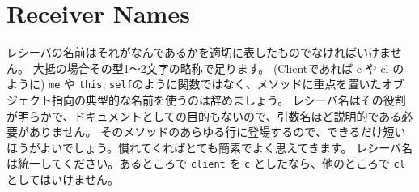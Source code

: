 \section{Receiver Names}

レシーバの名前はそれがなんであるかを適切に表したものでなければいけません。 大抵の場合その型1〜2文字の略称で足ります。 (Clientであれば c や cl のように) \texttt{me} や \texttt{this}, \texttt{self}のように関数ではなく、メソッドに重点を置いたオブジェクト指向の典型的な名前を使うのは辞めましょう。 レシーバ名はその役割が明らかで、ドキュメントとしての目的もないので、引数名ほど説明的である必要がありません。 そのメソッドのあらゆる行に登場するので、できるだけ短いほうがよいでしょう。慣れてくればとても簡素でよく思えてきます。 レシーバ名は統一してください。あるところで \texttt{client} を \texttt{c} としたなら、他のところで \texttt{cl} としてはいけません。
